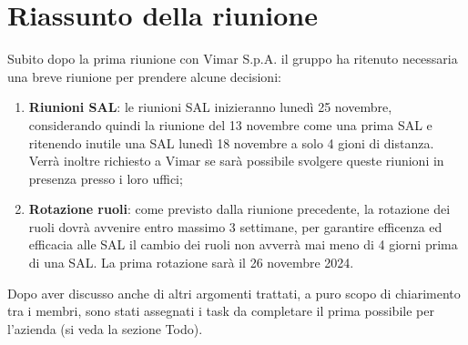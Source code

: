 \section{Riassunto della riunione}
Subito dopo la prima riunione con Vimar S.p.A. il gruppo ha ritenuto necessaria una breve riunione per prendere alcune decisioni:

\begin{enumerate}
    \item \textbf{Riunioni SAL}: le riunioni SAL inizieranno lunedì 25 novembre, considerando quindi la riunione del 13 novembre come una prima SAL e ritenendo inutile una SAL lunedì 18 novembre a solo 4 gioni di distanza. Verrà inoltre richiesto a Vimar se sarà possibile svolgere queste riunioni in presenza presso i loro uffici;

    \item \textbf{Rotazione ruoli}: come previsto dalla riunione precedente, la rotazione dei ruoli dovrà avvenire entro massimo 3 settimane, per garantire efficenza ed efficacia alle SAL il cambio dei ruoli non avverrà mai meno di 4 giorni prima di una SAL. La prima rotazione sarà il 26 novembre 2024.

\end{enumerate}

Dopo aver discusso anche di altri argomenti trattati, a puro scopo di chiarimento tra i membri, sono stati assegnati i task da completare il prima possibile per l'azienda (si veda la sezione Todo).
